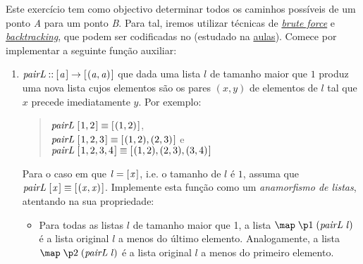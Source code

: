 \documentclass[a4paper]{article}
\newcommand{\Varid}[1]{\mathit{#1}}
\begin{document}
\Problema

Este exercício tem como objectivo determinar todos os caminhos
possíveis de um ponto \emph{A} para um ponto \emph{B}. Para tal,
iremos utilizar técnicas de
\href{https://en.wikipedia.org/wiki/Brute-force_search}{\emph{brute
force}} e
\href{https://en.wikipedia.org/wiki/Backtracking}{\emph{backtracking}}, que podem
ser codificadas no  (estudado na \href{https://haslab.github.io/CP/Material/}{aulas}). Comece por implementar a seguinte função auxiliar:

\begin{enumerate}
\item \ensuremath{\Varid{pairL}\mathbin{::}[\mskip1.5mu \Varid{a}\mskip1.5mu]\to [\mskip1.5mu (\Varid{a},\Varid{a})\mskip1.5mu]} que dada uma lista \ensuremath{\Varid{l}} de tamanho
maior que \ensuremath{\mathrm{1}} produz uma nova lista cujos elementos são os pares \ensuremath{(\Varid{x},\Varid{y})} de
elementos de \ensuremath{\Varid{l}} tal que \ensuremath{\Varid{x}} precede imediatamente \ensuremath{\Varid{y}}. Por exemplo:
\begin{quote}
     \ensuremath{\Varid{pairL}\;[\mskip1.5mu \mathrm{1},\mathrm{2}\mskip1.5mu]\equiv [\mskip1.5mu (\mathrm{1},\mathrm{2})\mskip1.5mu]},
\\
     \ensuremath{\Varid{pairL}\;[\mskip1.5mu \mathrm{1},\mathrm{2},\mathrm{3}\mskip1.5mu]\equiv [\mskip1.5mu (\mathrm{1},\mathrm{2}),(\mathrm{2},\mathrm{3})\mskip1.5mu]} e
\\
     \ensuremath{\Varid{pairL}\;[\mskip1.5mu \mathrm{1},\mathrm{2},\mathrm{3},\mathrm{4}\mskip1.5mu]\equiv [\mskip1.5mu (\mathrm{1},\mathrm{2}),(\mathrm{2},\mathrm{3}),(\mathrm{3},\mathrm{4})\mskip1.5mu]}
\end{quote}
Para o caso em que \ensuremath{\Varid{l}\mathrel{=}[\mskip1.5mu \Varid{x}\mskip1.5mu]}, i.e. o tamanho de \ensuremath{\Varid{l}} é \ensuremath{\mathrm{1}}, assuma que \ensuremath{\Varid{pairL}\;[\mskip1.5mu \Varid{x}\mskip1.5mu]\equiv [\mskip1.5mu (\Varid{x},\Varid{x})\mskip1.5mu]}. Implemente esta função como um \emph{anamorfismo de listas}, atentando na sua propriedade:

\begin{itemize}\em
\item      Para todas as listas \ensuremath{\Varid{l}} de tamanho maior que 1,
a lista \ensuremath{\map \;\p1\;(\Varid{pairL}\;\Varid{l})} é a lista original \ensuremath{\Varid{l}} a menos do último elemento.
Analogamente, a lista \ensuremath{\map \;\p2\;(\Varid{pairL}\;\Varid{l})}  é a lista original \ensuremath{\Varid{l}} a menos do primeiro elemento. 
\end{itemize}
\end{enumerate}
\end{document}
